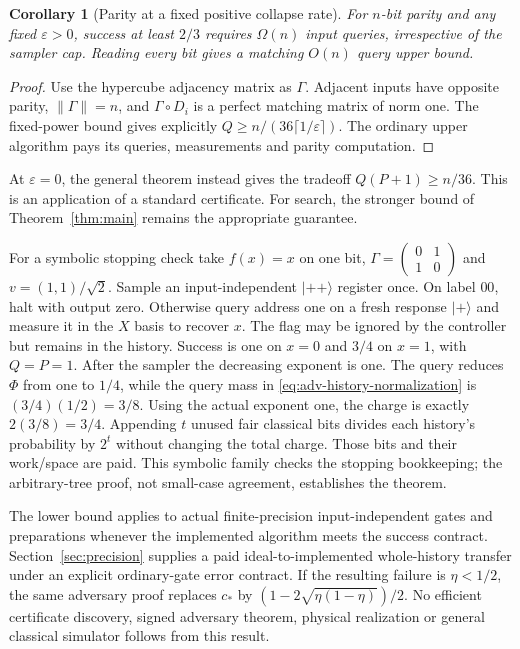 \documentclass[11pt]{article}
\newtheorem{corollary}[theorem]{Corollary}
\theoremstyle{remark}
\newcommand{\eps}{\varepsilon}
\newcommand{\ket}[1]{\lvert #1\rangle}
\begin{document}
\begin{corollary}[Parity at a fixed positive collapse rate]
For $n$-bit parity and any fixed $\eps>0$, success at least $2/3$ requires
$\Omega(n)$ input queries, irrespective of the sampler cap. Reading every
bit gives a matching $O(n)$ query upper bound.
\end{corollary}
\begin{proof}
Use the hypercube adjacency matrix as $\Gamma$. Adjacent inputs have
opposite parity, $\|\Gamma\|=n$, and $\Gamma\circ D_i$ is a perfect
matching matrix of norm one. The fixed-power bound gives explicitly
$Q\ge n/(36\lceil1/\eps\rceil)$. The ordinary
upper algorithm pays its queries, measurements and parity computation.
\end{proof}
At $\eps=0$, the general theorem instead gives the tradeoff
$Q(P+1)\ge n/36$. This is an application of a standard certificate.
For search, the stronger
bound of Theorem~\ref{thm:main} remains the appropriate guarantee.

For a symbolic stopping check take $f(x)=x$ on one bit,
$\Gamma=\left(\begin{smallmatrix}0&1\\1&0\end{smallmatrix}\right)$ and
$v=(1,1)/\sqrt2$. Sample an input-independent $\ket{++}$ register once.
On label $00$, halt with output zero. Otherwise query address one on a
fresh response $\ket+$ and measure it in the $X$ basis to recover $x$.
The flag may be ignored by the controller but remains in the history.
Success is one on $x=0$ and $3/4$ on $x=1$, with $Q=P=1$.
After the sampler the decreasing exponent is one. The query reduces
$\Phi$ from one to $1/4$, while the query mass in
\eqref{eq:adv-history-normalization} is $(3/4)(1/2)=3/8$.
Using the actual exponent one, the charge is exactly $2(3/8)=3/4$.
Appending $t$ unused fair classical bits divides each history's probability
by $2^t$ without changing the total charge. Those bits and their work/space
are paid. This symbolic family checks the stopping bookkeeping;
the arbitrary-tree proof, not small-case agreement, establishes the theorem.

The lower bound applies to actual finite-precision input-independent gates
and preparations whenever the implemented algorithm meets the success
contract. Section~\ref{sec:precision} supplies a paid ideal-to-implemented
whole-history transfer under an explicit ordinary-gate error contract.
If the resulting failure is $\eta<1/2$, the same adversary proof replaces
$c_*$ by $(1-2\sqrt{\eta(1-\eta)})/2$. No efficient certificate discovery, signed
adversary theorem, physical realization or general classical simulator
follows from this result.
\end{document}
